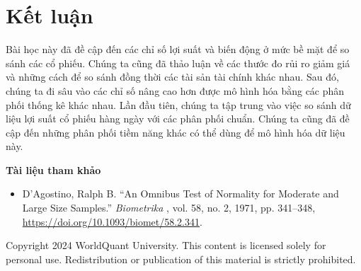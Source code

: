\section{Kết luận}

Bài học này đã đề cập đến các chỉ số lợi suất và biến động ở mức bề mặt để so sánh các cổ phiếu. Chúng ta cũng đã thảo luận về các thước đo rủi ro giảm giá và những cách để so sánh đồng thời các tài sản tài chính khác nhau. Sau đó, chúng ta đi sâu vào các chỉ số nâng cao hơn được mô hình hóa bằng các phân phối thống kê khác nhau. Lần đầu tiên, chúng ta tập trung vào việc so sánh dữ liệu lợi suất cổ phiếu hàng ngày với các phân phối chuẩn. Chúng ta cũng đã đề cập đến những phân phối tiềm năng khác có thể dùng để mô hình hóa dữ liệu này.

\textbf{Tài liệu tham khảo}

\begin{itemize}
  \item D'Agostino, Ralph B. ``An Omnibus Test of Normality for Moderate and Large Size Samples.'' \emph{Biometrika} , vol. 58, no. 2, 1971, pp. 341--348, \url{https://doi.org/10.1093/biomet/58.2.341}.
\end{itemize}
Copyright 2024 WorldQuant University. This content is licensed solely for personal use. Redistribution or publication of this material is strictly prohibited.

